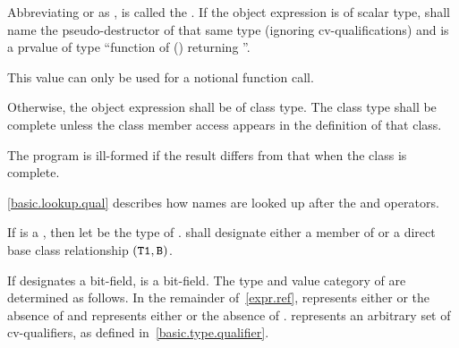 \pnum
Abbreviating
 or
as ,  is called the .
If the object expression is of scalar type,
 shall name the pseudo-destructor
of that same type (ignoring cv-qualifications) and
 is a prvalue of type ``function of () returning ''.
\begin{note}
This value can only be used
for a notional function call.
\end{note}

\pnum
Otherwise, the object expression shall be of class type.
The class type shall be complete
unless the class member access appears in the definition of that class.
\begin{note}
The program is ill-formed if the result differs from that
when the class is complete.
\end{note}
\begin{note}
\ref{basic.lookup.qual} describes how names are looked up after the
 and \tcode{->} operators.
\end{note}

\pnum
If  is a ,
then let  be the type of .
 shall designate either
a member of  or
a direct base class relationship $(\tcode{T1}, \tcode{B})$.

\pnum
If  designates a bit-field,  is a bit-field. The
type and value category of  are determined as follows.
In the remainder of~\ref{expr.ref},  represents either
 or the absence of  and  represents
either  or the absence of . 
represents an arbitrary set of cv-qualifiers, as defined
in~\ref{basic.type.qualifier}.

